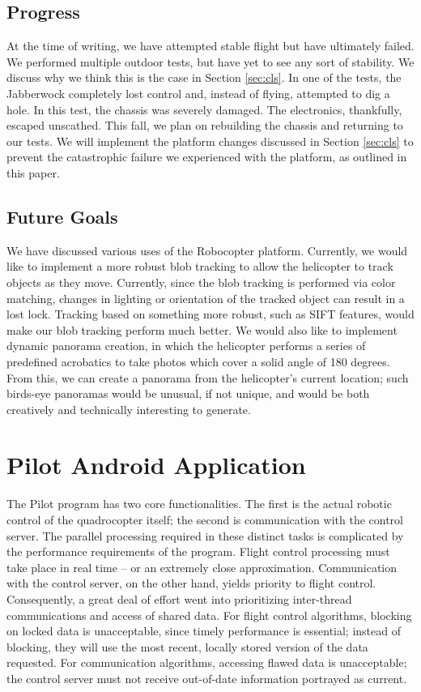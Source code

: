 \subsection{Progress}
At the time of writing, we have attempted stable flight but have
ultimately failed. We performed multiple outdoor tests, but have yet to
see any sort of stability. We discuss why we think this is the case in
Section \ref{sec:cls}. In one of the tests, the Jabberwock completely
lost control and, instead of flying, attempted to dig a hole. In this
test, the chassis was severely damaged. The electronics, thankfully,
escaped unscathed. This fall, we plan on rebuilding the chassis and
returning to our tests.  We will implement the platform changes
discussed in Section \ref{sec:cls} to prevent the catastrophic failure
we experienced with the platform, as outlined in this paper.

\subsection{Future Goals}
We have discussed various uses of the Robocopter platform. Currently,
we would like to implement a more robust blob tracking to allow the
helicopter to track objects as they move. Currently, since the blob
tracking is performed via color matching, changes in lighting or
orientation of the tracked object can result in a lost lock. Tracking
based on something more robust, such as SIFT features, would make our
blob tracking perform much better.  We would also like to implement
dynamic panorama creation, in which the helicopter performs a series
of predefined acrobatics to take photos which cover a solid angle of
180 degrees. From this, we can create a panorama from the helicopter's
current location; such birds-eye panoramas would be unusual, if not
unique, and would be both creatively and technically interesting to
generate.

\section{Pilot Android Application}
\label{sec:pilot}
The Pilot program has two core functionalities.‭ ‬The first is the
actual robotic control of the quadrocopter itself‭; ‬the second is
communication with the control server.‭ ‬The parallel processing
required in these distinct tasks is complicated by the performance
requirements of the program.‭ ‬Flight control processing must take place
in real time -- or an extremely close approximation.‭ ‬Communication
with the control server, on the other hand, yields priority to flight
control.‭ ‬Consequently,‭ ‬a great deal of effort went into prioritizing
inter-thread communications and access of shared data.‭ ‬For flight
control algorithms,‭ ‬blocking on locked data is unacceptable,‭ ‬since
timely performance is essential‭; ‬instead of blocking,‭ ‬they will use
the most recent,‭ ‬locally stored version of the data requested.‭ ‬For
communication algorithms,‭ ‬accessing flawed data is unacceptable‭; ‬the
control server must not receive out-of-date information portrayed as
current.

